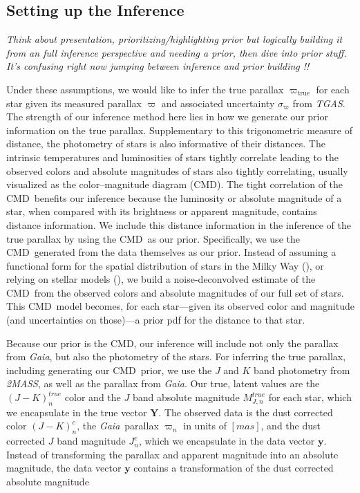 \documentclass[modern]{aastex61}
\newcommand{\acronym}[1]{{\small{#1}}}
\newcommand{\project}[1]{\textsl{#1}}
\newcommand{\tgas}{\project{\acronym{TGAS}}}
\newcommand{\tmass}{\project{\acronym{2MASS}}}
\newcommand{\gaia}{\project{Gaia}}
\newcommand{\cmd}{\acronym{CMD}}
\newcommand{\true}{\mathrm{true}}
\begin{document}
\subsection{Setting up the Inference}
 \emph{Think about presentation, prioritizing/highlighting prior but logically building it from an full inference perspective and needing a prior, then dive into prior stuff. It's confusing right now jumping between inference and prior building !!}

Under these assumptions, we would like to infer the true parallax $\varpi_{\true}$ for each star given its measured parallax $\varpi$ and associated uncertainty $\sigma_{\varpi}$ from \tgas.
The strength of our inference method here lies in how we generate our prior information on the true parallax.
Supplementary to this trigonometric measure of distance, the photometry of stars is also informative of their distances.
The intrinsic temperatures and luminosities of stars tightly correlate leading to the observed colors and absolute magnitudes of stars also tightly correlating, usually visualized as the color--magnitude diagram (\cmd).
The tight correlation of the \cmd\ benefits our inference because the luminosity or absolute magnitude of a star, when compared with its brightness or apparent magnitude, contains distance information.
We include this distance information in the inference of the true parallax by using the \cmd\ as our prior.
Specifically, we use the \cmd\ generated from the data themselves as our prior.
Instead of assuming a functional form for the spatial distribution of stars in the Milky Way (\citealt{astraatmadja16b}), or relying on stellar models (\citealt{gaia16}), we build a noise-deconvolved estimate of the \cmd\ from the observed colors and absolute magnitudes of our full set of stars.
This \cmd\ model becomes, for each star---given its observed color and magnitude (and uncertainties on those)---a prior pdf for the distance to that star.

Because our prior is the \cmd, our inference will include not only the parallax from \gaia, but also the photometry of the stars. For inferring the true parallax, including generating our \cmd\ prior, we use the $J$ and $K$ band photometry from \tmass, as well as the parallax from \gaia. Our true, latent values are the $(J-K)^{true}_n$ color and the $J$ band absolute magnitude $M^{true}_{J,n}$ for each star, which we encapsulate in the true vector $\mathbf{Y}$. The observed data is the dust corrected color $(J-K)^c_n$, the \gaia\ parallax $\varpi_n$ in units of $[mas]$, and the dust corrected $J$ band magnitude $J^c_n$, which we encapsulate in the data vector $\mathbf{y}$. Instead of transforming the parallax and apparent magnitude into an absolute magnitude, the data vector $\mathbf{y}$ contains a transformation of the dust corrected absolute magnitude
\end{document}
